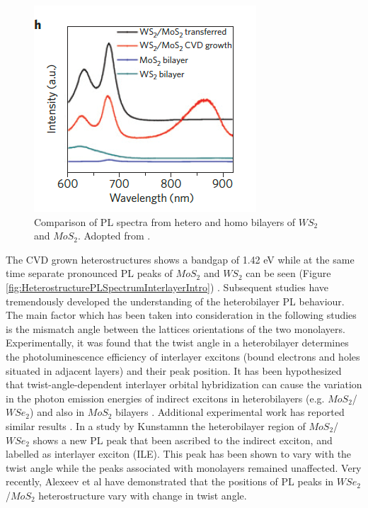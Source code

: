 \begin{figure}[h]
	\begin{center}
		\includegraphics[scale=1]{Heterostructures/HeterostructurePLSpectrumIntroComparison.png}
		\caption{Comparison of PL spectra from hetero and homo bilayers of $WS_2$ and $MoS_2$. Adopted from \cite{Gong2014}.}
		\label{fig:HeterostructurePLSpectrumIntroComparison}
	\end{center}
\end{figure}

The CVD grown heterostructures shows a bandgap of 1.42 eV while at the same time separate pronounced PL peaks of $MoS_2$ and $WS_2$ can be seen (Figure \ref{fig:HeterostructurePLSpectrumInterlayerIntro}) \cite{Gong2014}. Subsequent studies have tremendously developed the understanding of the heterobilayer PL behaviour. The main factor which has been taken into consideration in the following studies is the mismatch angle between the lattices orientations of the two monolayers. Experimentally, it was found that the twist angle in a heterobilayer determines the photoluminescence efficiency of interlayer excitons (bound  electrons and holes situated in adjacent layers) and their peak position. It has been hypothesized that twist-angle-dependent interlayer orbital hybridization can cause the variation in the photon emission energies of indirect excitons in heterobilayers (e.g. $MoS_2$/$WSe_2$) and also in $MoS_2$ bilayers \cite{Nayak2017}. Additional experimental work has reported similar results \cite{Heo2015}\cite{Liu2014a}. In a study by Kunstamnn \cite{Kunstmann2018} the heterobilayer region of $MoS_2$/$WSe_2$ shows a new PL peak that been ascribed to the indirect exciton, and labelled as interlayer exciton (ILE). This peak has been shown to vary with the twist angle while the peaks associated with monolayers remained unaffected. Very recently, Alexeev et al \cite{Alexeev2019} have demonstrated that the positions of PL peaks in $WSe_2$/$MoS_2$ heterostructure vary with change in twist angle.